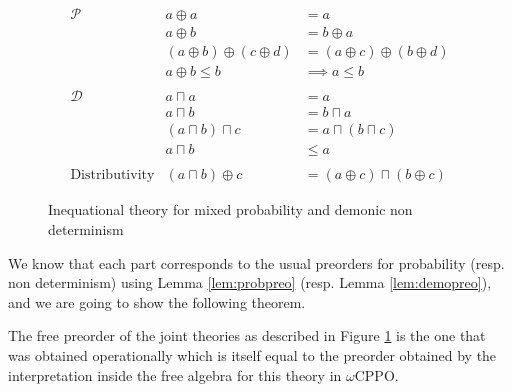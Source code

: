 \begin{figure}[h]
    \begin{equation*}
        \begin{array}{lrl}
            \mathcal{P} & a \oplus a &= a \\
                        & a \oplus b &= b \oplus a \\
                        & (a \oplus b) \oplus (c \oplus d) &= (a \oplus c) \oplus (b \oplus d) \\
                        & a \oplus b \leq b &\implies a \leq b  \\
            \\
            \mathcal{D} & a \sqcap a &= a \\
                        & a \sqcap b &= b \sqcap a \\
                        & (a \sqcap b) \sqcap c &= a \sqcap (b \sqcap c) \\
                        & a \sqcap b &\leq a \\ 
            \\
            \text{Distributivity}
            & (a \sqcap b) \oplus c &= (a \oplus c) \sqcap (b \oplus c)
        \end{array}
    \end{equation*}
    \caption{Inequational theory for mixed probability and demonic non
    determinism}
    \label{fig:mixtheory}
\end{figure}

We know that each part corresponds to the usual 
preorders for probability (resp. non determinism) using 
Lemma \ref{lem:probpreo} (resp. Lemma \ref{lem:demopreo}), 
and we are going to show the following theorem.

\begin{theorem}
The 
free preorder of the joint theories as described in Figure \ref{fig:mixtheory}
is the one that was obtained 
operationally which is itself equal to the preorder 
obtained by the interpretation inside the free 
algebra for this theory in $\omega$CPPO.
\end{theorem}

